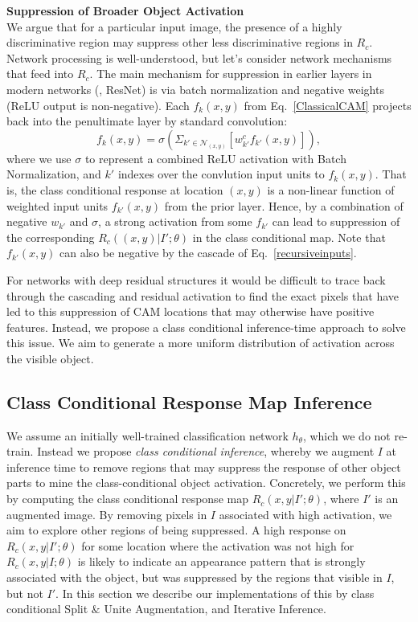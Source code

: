\documentclass[10pt,twocolumn,letterpaper]{article}
\begin{document}
\noindent\textbf{Suppression of Broader Object Activation}\\
We argue that for a particular input image, the presence of a highly discriminative region may suppress other less discriminative regions in $R_c$. 
Network processing is well-understood, but let's
consider network mechanisms that feed into $R_c$.
The main mechanism for suppression in earlier layers in modern networks (\eg, ResNet) is via batch normalization and negative weights (ReLU output is non-negative). Each $f_k(x,y)$ from 
Eq.~\ref{ClassicalCAM} projects back into the penultimate layer by standard convolution:
\begin{equation}
f_k(x,y) = \sigma (\Sigma_{k' \in \mathcal{N}_{(x,y)}} [w^c_{k'} f_{k'}(x,y)]),
\label{recursiveinputs}
\end{equation}
where we use $\sigma$ to represent a combined ReLU activation with Batch Normalization, and $k'$ indexes over the convlution  input units to $f_k(x,y)$.
That is, the class conditional response at location $(x,y)$ is a non-linear function of weighted input units $f_{k'}(x,y)$ from the prior layer.
Hence, by a combination of negative $w_{k'}$ and $\sigma$, a strong activation from some $f_{k'}$ can lead to suppression of the corresponding $R_c((x,y)|I'; \theta)$ in the class 
conditional map. Note that $f_{k'}(x,y)$ can also be negative by the cascade of Eq.~\ref{recursiveinputs}. 

For networks with deep residual structures it would be difficult to trace back through the cascading and residual activation to find the exact pixels that have led to this suppression of CAM locations that may otherwise have positive features. 
Instead, we propose a class conditional inference-time approach to solve this issue. We aim to generate a more uniform distribution of activation across the visible object.

\subsection{Class Conditional Response Map Inference}
We assume an initially well-trained classification network $h_\theta$, which we do not re-train. Instead we propose \emph{class conditional inference}, whereby we augment $I$ at inference time to remove regions that may suppress the response of other object parts  to mine the class-conditional object activation. 
Concretely, we perform this by computing the class conditional response map $R_c(x,y|I';\theta)$, where $I'$ is an augmented image. 
By removing pixels in $I$ associated with high activation, we aim to explore other regions of being suppressed. A high response on $R_c(x,y|I';\theta)$ for some location where the activation was not high for  
$R_c(x,y|I;\theta)$ is likely to indicate an appearance pattern that is strongly associated with the object, but was suppressed by the regions that visible in $I$, but not $I'$. In this section we describe our implementations of this by class conditional Split $\&$ Unite Augmentation, and Iterative Inference.
\end{document}
